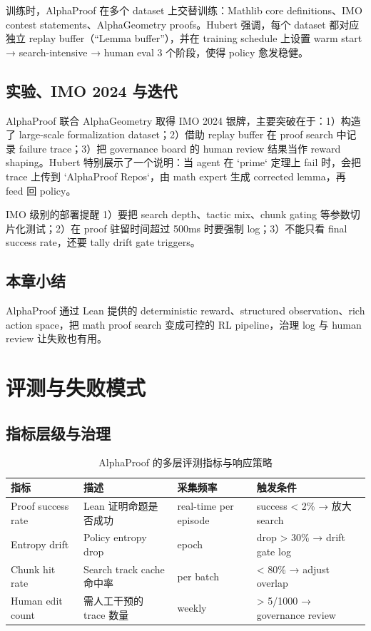 \documentclass[a4paper]{article}
\begin{document}
训练时，AlphaProof 在多个 dataset 上交替训练：Mathlib core definitions、IMO contest statements、AlphaGeometry proofs。Hubert 强调，每个 dataset 都对应独立 replay buffer（“Lemma buffer”），并在 training schedule 上设置 warm start → search-intensive → human eval 3 个阶段，使得 policy 愈发稳健。

\subsection{实验、IMO 2024 与迭代}
AlphaProof 联合 AlphaGeometry 取得 IMO 2024 银牌，主要突破在于：1）构造了 large-scale formalization dataset；2）借助 replay buffer 在 proof search 中记录 failure trace；3）把 governance board 的 human review 结果当作 reward shaping。Hubert 特别展示了一个说明：当 agent 在 `prime` 定理上 fail 时，会把 trace 上传到 `AlphaProof Repos`，由 math expert 生成 corrected lemma，再 feed 回 policy。
\begin{warningbox}{IMO 级别的部署提醒}
1）要把 search depth、tactic mix、chunk gating 等参数切片化测试；2）在 proof 驻留时间超过 500ms 时要强制 log；3）不能只看 final success rate，还要 tally drift gate triggers。
\end{warningbox}

\subsection{本章小结}
AlphaProof 通过 Lean 提供的 deterministic reward、structured observation、rich action space，把 math proof search 变成可控的 RL pipeline，治理 log 与 human review 让失败也有用。
\newpage

\section{评测与失败模式}

\subsection{指标层级与治理}
\begin{table}[H]
\centering
\begin{tabular}{p{3.5cm}p{4cm}p{3.5cm}p{3cm}}
\toprule
指标 & 描述 & 采集频率 & 触发条件 \\
\midrule
Proof success rate & Lean 证明命题是否成功 & real-time per episode & success < 2\% → 放大 search \\
Entropy drift & Policy entropy drop & epoch & drop > 30\% → drift gate log \\
Chunk hit rate & Search track cache 命中率 & per batch & < 80\% → adjust overlap \\
Human edit count & 需人工干预的 trace 数量 & weekly & > 5/1000 → governance review \\
\bottomrule
\end{tabular}
\caption{AlphaProof 的多层评测指标与响应策略}
\end{table}
\end{document}
